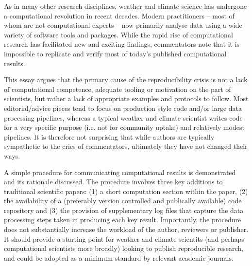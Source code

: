 As in many other research disciplines, weather and climate science has undergone a computational revolution in recent decades. Modern practitioners – most of whom are not computational experts – now primarily analyse data using a wide variety of software tools and packages. While the rapid rise of computational research has facilitated new and exciting findings, commentators note that it is impossible to replicate and verify most of today's published computational results.

This essay argues that the primary cause of the reproducibility crisis is not a lack of computational competence, adequate tooling or motivation on the part of scientists, but rather a lack of appropriate examples and protocols to follow. Most editorial/advice pieces tend to focus on production style code and/or large data processing pipelines, whereas a typical weather and climate scientist writes code for a very specific purpose (i.e. not for community uptake) and relatively modest pipelines. It is therefore not surprising that while authors are typically sympathetic to the cries of commentators, ultimately they have not changed their ways.

A simple procedure for communicating computational results is demonstrated and its rationale discussed. The procedure involves three key additions to traditional scientific papers: (1) a short computation section within the paper, (2) the availability of a (preferably version controlled and publically available) code repository and (3) the provision of supplementary log files that capture the data processing steps taken in producing each key result. Importantly, the procedure does not substantially increase the workload of the author, reviewers or publisher. It should provide a starting point for weather and climate scientits (and perhaps computational scientists more broadly) looking to publish reproducible research, and could be adopted as a minimum standard by relevant academic journals.
